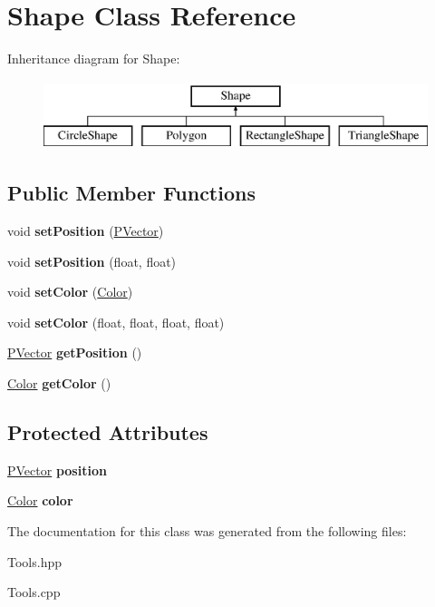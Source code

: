 \hypertarget{class_shape}{}\section{Shape Class Reference}
\label{class_shape}
Inheritance diagram for Shape\+:\begin{figure}[H]
\begin{center}
\leavevmode
\includegraphics[height=2.000000cm]{class_shape}
\end{center}
\end{figure}
\subsection*{Public Member Functions}
\begin{DoxyCompactItemize}
\item 
\hypertarget{class_shape_a402c108e2d1a078a1974b3ecc7a32fc6}{}\label{class_shape_a402c108e2d1a078a1974b3ecc7a32fc6} 
void {\bfseries set\+Position} (\hyperlink{struct_p_vector}{P\+Vector})
\item 
\hypertarget{class_shape_adeca39958a7adbb8c80f5af9cf5f60bd}{}\label{class_shape_adeca39958a7adbb8c80f5af9cf5f60bd} 
void {\bfseries set\+Position} (float, float)
\item 
\hypertarget{class_shape_aeabb7a6bd05635c30fa56e31766b09bc}{}\label{class_shape_aeabb7a6bd05635c30fa56e31766b09bc} 
void {\bfseries set\+Color} (\hyperlink{struct_color}{Color})
\item 
\hypertarget{class_shape_a11a5311064e9504e1acfdd91ec94882d}{}\label{class_shape_a11a5311064e9504e1acfdd91ec94882d} 
void {\bfseries set\+Color} (float, float, float, float)
\item 
\hypertarget{class_shape_a12f4452300d4321762fbf466e37190e0}{}\label{class_shape_a12f4452300d4321762fbf466e37190e0} 
\hyperlink{struct_p_vector}{P\+Vector} {\bfseries get\+Position} ()
\item 
\hypertarget{class_shape_ab20c5a85d59e7b9d0164158f4ad6c2a4}{}\label{class_shape_ab20c5a85d59e7b9d0164158f4ad6c2a4} 
\hyperlink{struct_color}{Color} {\bfseries get\+Color} ()
\end{DoxyCompactItemize}
\subsection*{Protected Attributes}
\begin{DoxyCompactItemize}
\item 
\hypertarget{class_shape_afb4e17803a82f3144777cd249480cb91}{}\label{class_shape_afb4e17803a82f3144777cd249480cb91} 
\hyperlink{struct_p_vector}{P\+Vector} {\bfseries position}
\item 
\hypertarget{class_shape_ac56e2bf5eb24cf37b6e08c671501566b}{}\label{class_shape_ac56e2bf5eb24cf37b6e08c671501566b} 
\hyperlink{struct_color}{Color} {\bfseries color}
\end{DoxyCompactItemize}


The documentation for this class was generated from the following files\+:\begin{DoxyCompactItemize}
\item 
Tools.\+hpp\item 
Tools.\+cpp\end{DoxyCompactItemize}

